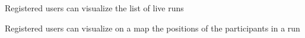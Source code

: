 \begin{goalList}
\begin{enumerate}[label={[}G 3.\arabic*{]}]
\item\label{goal:run5}Registered users can visualize the list of live runs


\item \label{goal:run4}Registered users can visualize on a map the positions of the participants
in a run


\end{enumerate}
\end{goalList}

